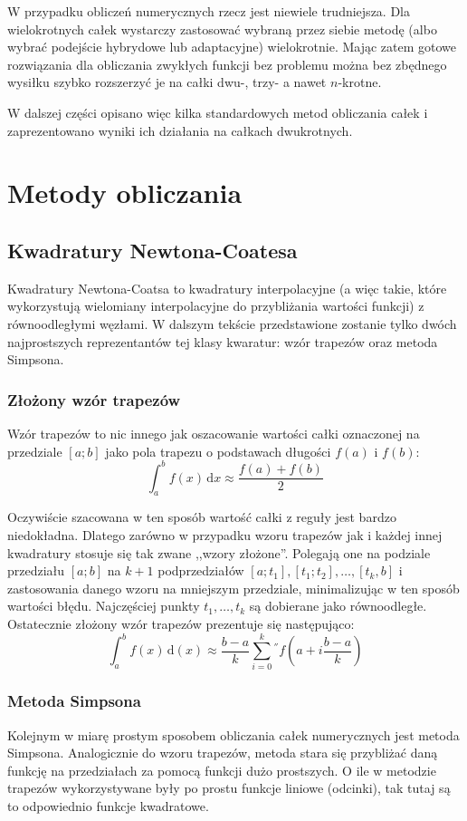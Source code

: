 \documentclass[11pt,leqno]{article}
\newcommand{\dvar}[1]{\,\mathrm{d}#1}
\begin{document}
W przypadku obliczeń numerycznych rzecz jest niewiele trudniejsza. Dla wielokrotnych całek wystarczy zastosować wybraną przez siebie metodę (albo wybrać podejście hybrydowe lub adaptacyjne) wielokrotnie. Mając zatem gotowe rozwiązania dla obliczania zwykłych funkcji bez problemu można bez zbędnego wysiłku szybko rozszerzyć je na całki dwu-, trzy- a nawet $n$-krotne.

W dalszej części opisano więc kilka standardowych metod obliczania całek i zaprezentowano wyniki ich działania na całkach dwukrotnych.



\section{Metody obliczania}


\subsection{Kwadratury Newtona-Coatesa}
Kwadratury Newtona-Coatsa to kwadratury interpolacyjne (a więc takie, które wykorzystują wielomiany interpolacyjne do przybliżania wartości funkcji) z równoodległymi węzłami. W dalszym tekście przedstawione zostanie tylko dwóch najprostszych reprezentantów tej klasy kwaratur: wzór trapezów oraz metoda Simpsona.

\subsubsection{Złożony wzór trapezów}
Wzór trapezów to nic innego jak oszacowanie wartości całki oznaczonej na przedziale $[a; b]$ jako pola trapezu o podstawach długości $f(a)$ i $f(b)$:
\[
  \int_a^b f(x) \dvar{x} \approx \frac{f(a) + f(b)}{2}
\]

Oczywiście szacowana w ten sposób wartość całki z reguły jest bardzo niedokładna. Dlatego zarówno w przypadku wzoru trapezów jak i każdej innej kwadratury stosuje się tak zwane ,,wzory złożone''. Polegają one na podziale przedziału $[a; b]$ na $k + 1$ podprzedziałów $[a; t_1], [t_1; t_2], \dots, [t_k, b]$ i zastosowania danego wzoru na mniejszym przedziale, minimalizując w ten sposób wartości błędu. Najczęściej punkty $t_1, \dots, t_k$ są dobierane jako równoodległe. Ostatecznie złożony wzór trapezów prezentuje się następująco:
\[
  \int_a^b f(x) \dvar(x)
\approx
  \frac{b - a}{k} \sum_{i = 0}^{k} {}^{''} f(a + i \frac{b - a}{k})
\]


\subsubsection{Metoda Simpsona}
Kolejnym w miarę prostym sposobem obliczania całek numerycznych jest metoda Simpsona. Analogicznie do wzoru trapezów, metoda stara się przybliżać daną funkcję na przedziałach za pomocą funkcji dużo prostszych. O ile w metodzie trapezów wykorzystywane były po prostu funkcje liniowe (odcinki), tak tutaj są to odpowiednio funkcje kwadratowe.
\end{document}
